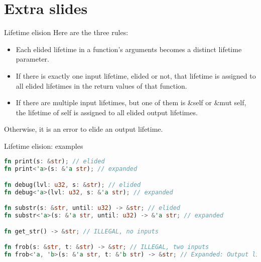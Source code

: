 \documentclass{beamer}
\begin{document}
\section{Extra slides}

\begin{frame}{Lifetime elision}
Here are the three rules:
\begin{itemize}
  \item Each elided lifetime in a function’s arguments becomes a distinct lifetime parameter.
  \item If there is exactly one input lifetime, elided or not, that lifetime is assigned to all elided lifetimes in the return values of that function.
  \item If there are multiple input lifetimes, but one of them is &self or &mut self, the lifetime of self is assigned to all elided output lifetimes.
\end{itemize}
Otherwise, it is an error to elide an output lifetime.
\end{frame}

\begin{frame}[fragile]{Lifetime elision: examples}
\begin{lstlisting}[language=Rust]
fn print(s: &str); // elided
fn print<'a>(s: &'a str); // expanded

fn debug(lvl: u32, s: &str); // elided
fn debug<'a>(lvl: u32, s: &'a str); // expanded

fn substr(s: &str, until: u32) -> &str; // elided
fn substr<'a>(s: &'a str, until: u32) -> &'a str; // expanded

fn get_str() -> &str; // ILLEGAL, no inputs

fn frob(s: &str, t: &str) -> &str; // ILLEGAL, two inputs
fn frob<'a, 'b>(s: &'a str, t: &'b str) -> &str; // Expanded: Output lifetime is ambiguous
\end{lstlisting}
\end{frame}
\end{document}
